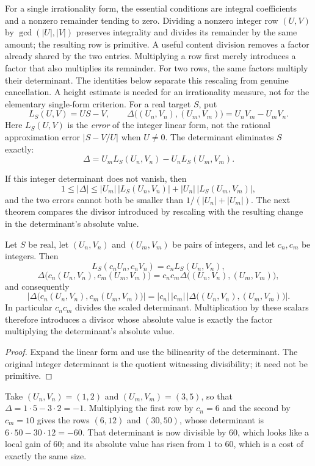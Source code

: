 \documentclass[11pt]{article}
\begin{document}
For a single irrationality form, the essential conditions are
integral coefficients and a nonzero remainder tending to zero.
Dividing a nonzero integer row $(U,V)$ by $\gcd(|U|,|V|)$
preserves integrality and divides its remainder by the same amount;
the resulting row is primitive. A useful content division removes a factor already shared by the
two entries. Multiplying a row first merely introduces a factor
that also multiplies its remainder. For two rows, the same factors
multiply their determinant. The identities below separate this
rescaling from genuine cancellation. A height estimate is needed
for an irrationality measure, not for the elementary single-form
criterion. For a real target $S$, put
\[
 L_S(U,V)=US-V,
 \qquad
 \Delta\bigl((U_n,V_n),(U_m,V_m)\bigr)=U_nV_m-U_mV_n.
\]
Here \(L_S(U,V)\) is the \emph{error} of the integer linear form,
not the rational approximation error $|S-V/U|$ when $U\ne0$.
The determinant eliminates \(S\) exactly:
\[
\Delta=U_mL_S(U_n,V_n)-U_nL_S(U_m,V_m).
\]

If this integer determinant does not vanish, then
\[
 1\le|\Delta|
  \le|U_m|\,\bigl|L_S(U_n,V_n)\bigr|+|U_n|\,\bigl|L_S(U_m,V_m)\bigr|,
\]
and the two errors cannot both be smaller than
\(1/(|U_n|+|U_m|)\).  The next theorem compares the divisor introduced by rescaling with
the resulting change in the determinant's absolute value.

\begin{theorem}\label{long1049:res:content}
Let \(S\) be real, let \((U_n,V_n)\) and \((U_m,V_m)\) be pairs of integers, and
let \(c_n,c_m\) be integers.  Then
\[
 L_S(c_nU_n,c_nV_n)=c_nL_S(U_n,V_n),
\]
\[
 \Delta\bigl(c_n(U_n,V_n),c_m(U_m,V_m)\bigr)
 =c_nc_m\Delta\bigl((U_n,V_n),(U_m,V_m)\bigr),
\]
and consequently
\[
 \left|\Delta\bigl(c_n(U_n,V_n),c_m(U_m,V_m)\bigr)\right|
 =|c_n|\,|c_m|\,
   \left|\Delta\bigl((U_n,V_n),(U_m,V_m)\bigr)\right|.
\]
In particular \(c_nc_m\) divides the scaled determinant. Multiplication
by these scalars therefore introduces a divisor whose absolute value is
exactly the factor multiplying the determinant's absolute value.
\end{theorem}

\begin{proof}
Expand the linear form and use the bilinearity of the determinant.
The original integer determinant is the quotient witnessing divisibility;
it need not be primitive.
\end{proof}

\begin{example}\label{long1049:ex:content}
Take \((U_n,V_n)=(1,2)\) and \((U_m,V_m)=(3,5)\), so that
\(\Delta=1\cdot5-3\cdot2=-1\).  Multiplying the first row by \(c_n=6\) and the
second by \(c_m=10\) gives the rows \((6,12)\) and \((30,50)\), whose
determinant is \(6\cdot50-30\cdot12=-60\).  That determinant is now divisible
by \(60\), which looks like a local gain of \(60\); and its absolute value has
risen from \(1\) to \(60\), which is a cost of exactly the same size.
\end{example}
\end{document}
